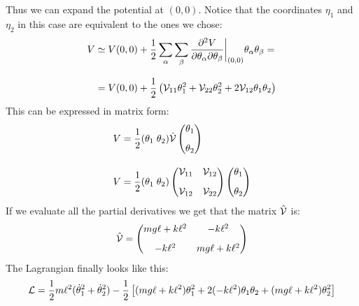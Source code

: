 Thus we can expand the potential at $(0,0)$. Notice that the coordinates $\eta_1$ and $\eta_2$ in this case are equivalent to the ones we chose:
\begin{equation}
    \begin{split}
        V &\simeq V(0,0) +\dfrac{1}{2}\displaystyle\sum_{\alpha}\displaystyle\sum_{\beta} \dfrac{\partial^2 V}{\partial \theta_{\alpha} \partial \theta_{\beta}}\bigg|_{(0,0)}\theta_{\alpha}\theta_{\beta} = \\[8pt]
        &= V(0,0) +\dfrac{1}{2}\left(\mathcal{V}_{11}\theta_1^2 + \mathcal{V}_{22}\theta_2^2 + 2\mathcal{V}_{12}\theta_1\theta_2\right)
    \end{split}
\end{equation}
This can be expressed in matrix form:
\begin{equation}
    \begin{split}
        V &= \dfrac{1}{2}(\theta_1\;\theta_2)\hat{\mathcal{V}}\begin{pmatrix}
            \theta_1 \\[8pt]
            \theta_2
        \end{pmatrix}\\[8pt]
        V &= \dfrac{1}{2}(\theta_1\;\theta_2)\begin{pmatrix}
            \mathcal{V}_{11} & \mathcal{V}_{12}\\[8pt]
            \mathcal{V}_{12} & \mathcal{V}_{22}
        \end{pmatrix} \begin{pmatrix}
            \theta_1 \\[8pt]
            \theta_2
        \end{pmatrix}
    \end{split}
\end{equation}
If we evaluate all the partial derivatives we get that the matrix $\hat{\mathcal{V}}$ is:
\begin{equation}
    \hat{\mathcal{V}} = \begin{pmatrix}
        mg\ell+k\ell^2 & -k\ell^2\\[8pt]
        -k\ell^2 & mg\ell+k\ell^2
    \end{pmatrix}
\end{equation}
The Lagrangian finally looks like this:
\begin{equation}
    \mathcal{L} = \dfrac{1}{2}m\ell^2(\dot{\theta}_1^2+\dot{\theta}_2^2) - \dfrac{1}{2}\left[(mg\ell+k\ell^2)\theta_1^2 + 2(-k\ell^2)\theta_1\theta_2 + (mg\ell+k\ell^2)\theta_2^2 \right]
\end{equation}
